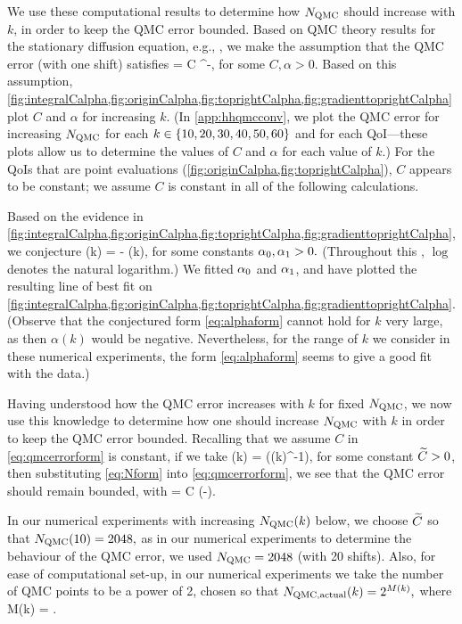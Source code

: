 We use these computational results to determine how $N_{\mathrm{QMC}}$ should increase with $k$, in order to keep the QMC error bounded. Based on QMC theory results for the stationary diffusion equation, e.g., \cite[Equation 4.2]{GrKuNuScSl:11}, we make the assumption that the QMC error (with one shift) satisfies
\beq\label{eq:qmcerrorform}
 = C \NQMC^{-\alpha},
\eeq
for some $C, \alpha > 0.$ Based on this assumption, \cref{fig:integralCalpha,fig:originCalpha,fig:toprightCalpha,fig:gradienttoprightCalpha} plot $C$ and $\alpha$ for increasing $k$. (In \cref{app:hhqmcconv}, we plot the QMC error for increasing $N_{\mathrm{QMC}}$ for each $k \in \set{10,20,30,40,50,60}$ and for each QoI---these plots allow us to determine the values of $C$ and $\alpha$ for each value of $k.$) For the QoIs that are point evaluations (\cref{fig:originCalpha,fig:toprightCalpha}), $C$ appears to be constant; we assume $C$ is constant in all of the following calculations.

Based on the evidence in \cref{fig:integralCalpha,fig:originCalpha,fig:toprightCalpha,fig:gradienttoprightCalpha}, we conjecture
\beq\label{eq:alphaform}
\alpha(k) = \alphaz - \alphao\log(k),
\eeq
for some constants $\alpha_{0},\alpha_{1} > 0.$ (Throughout this , $\log$ denotes the natural logarithm.) We fitted $\alpha_{0}$ and $\alpha_{1}$, and have plotted the resulting line of best fit on \cref{fig:integralCalpha,fig:originCalpha,fig:toprightCalpha,fig:gradienttoprightCalpha}. (Observe that the conjectured form \cref{eq:alphaform} cannot hold for $k$ very large, as then $\alpha(k)$ would be negative. Nevertheless, for the range of $k$ we consider in these numerical experiments, the form \cref{eq:alphaform} seems to give a good fit with the data.)

Having understood how the QMC error increases with $k$ for fixed $N_{\mathrm{QMC}}$, we now use this knowledge to determine how one should increase $N_{\mathrm{QMC}}$ with $k$ in order to keep the QMC error bounded. Recalling that we assume $C$ in \cref{eq:qmcerrorform} is constant, if we take
\beq\label{eq:Nform}
\NQMC(k) = \exp\mleft(\Ctilde \alpha(k)^{-1}\mright),
\eeq
for some constant $\widetilde{C} > 0$, then substituting \cref{eq:Nform} into \cref{eq:qmcerrorform}, we see that the QMC error should remain bounded, with
\beqs
{} = C \exp\mleft(-\Ctilde\mright).
\eeqs

In our numerical experiments with increasing $N_{\mathrm{QMC}}(k)$ below, we choose $\widetilde{C}$ so that $N_{\mathrm{QMC}}(10) = 2048,$ as in our numerical experiments to determine the behaviour of the QMC error, we used $N_{\mathrm{QMC}} = 2048$ (with 20 shifts). Also, for ease of computational set-up, in our numerical experiments we take the number of QMC points to be a power of 2, chosen so that $N_{\mathrm{QMC,actual}}(k) = 2^{M(k)},$ where
\beqs
M(k) = .
\eeqs

